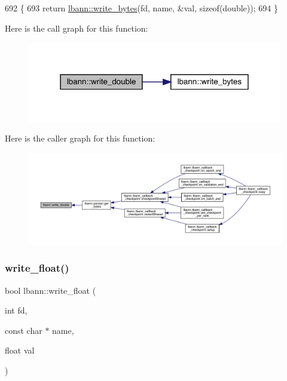 \begin{DoxyCode}
692                                                              \{
693   \textcolor{keywordflow}{return} \hyperlink{namespacelbann_aed95061796f19fa1648dcc99dc335abd}{lbann::write\_bytes}(fd, name, &val, \textcolor{keyword}{sizeof}(\textcolor{keywordtype}{double}));
694 \}
\end{DoxyCode}
Here is the call graph for this function\+:\nopagebreak
\begin{figure}[H]
\begin{center}
\leavevmode
\includegraphics[width=315pt]{namespacelbann_a827b050911630a21f248b128e3859044_cgraph}
\end{center}
\end{figure}
Here is the caller graph for this function\+:\nopagebreak
\begin{figure}[H]
\begin{center}
\leavevmode
\includegraphics[width=350pt]{namespacelbann_a827b050911630a21f248b128e3859044_icgraph}
\end{center}
\end{figure}
\mbox{\label{namespacelbann_a73339e4587f8ce7f653be03a3a6cbcd0}} 
\subsubsection{\texorpdfstring{write\+\_\+float()}{write\_float()}}
{\footnotesize\ttfamily bool lbann\+::write\+\_\+float (\begin{DoxyParamCaption}\item[{int}]{fd,  }\item[{const char $\ast$}]{name,  }\item[{float}]{val }\end{DoxyParamCaption})}




